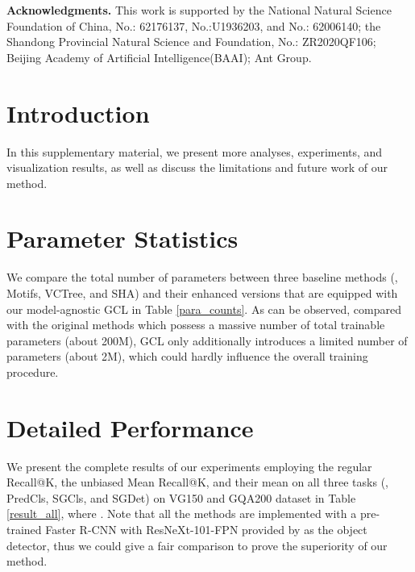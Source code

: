 \documentclass[10pt,twocolumn,letterpaper]{article}
\begin{document}
{\setlength{\parskip}{8pt}
\noindent\textbf{Acknowledgments.} This work is supported by the National Natural Science Foundation of China, No.: 62176137, No.:U1936203, and No.: 62006140; the Shandong Provincial Natural Science and Foundation, No.: ZR2020QF106; Beijing Academy of Artificial Intelligence(BAAI); Ant Group.
\setlength{\parskip}{0pt}

\newpage
{\small


}

\newpage

\setcounter{section}{0}

\setlength{\parskip}{0pt}
\section{Introduction}

In this supplementary material, we present more analyses, experiments, and visualization results, as well as discuss the limitations and future work of our method.

\section{Parameter Statistics}
We compare the total number of parameters between three baseline methods (\ie, Motifs, VCTree, and SHA) and their enhanced versions that are equipped with our model-agnostic GCL in Table \ref{para_counts}. As can be observed, compared with the original methods which possess a massive number of total trainable parameters (about 200M), GCL only additionally introduces a limited number of parameters (about 2M), which could hardly influence the overall training procedure.

\section{Detailed Performance}
We present the complete results of our experiments employing the regular Recall@K\cite{lu2016visual}, the unbiased Mean Recall@K\cite{tang2019learning,chen2019knowledge}, and their mean\cite{lin2020gps} on all three tasks (\ie, PredCls, SGCls, and SGDet) on VG150\cite{krishna2016visual} and GQA200\cite{hudson2019gqa} dataset in Table \ref{result_all}, where . Note that all the methods are implemented with a pre-trained Faster R-CNN\cite{Ren2017Faster} with ResNeXt-101-FPN\cite{xie2017aggregated} provided by \cite{tang2020unbiased} as the object detector, thus we could give a fair comparison to prove the superiority of our method.

}
\end{document}
